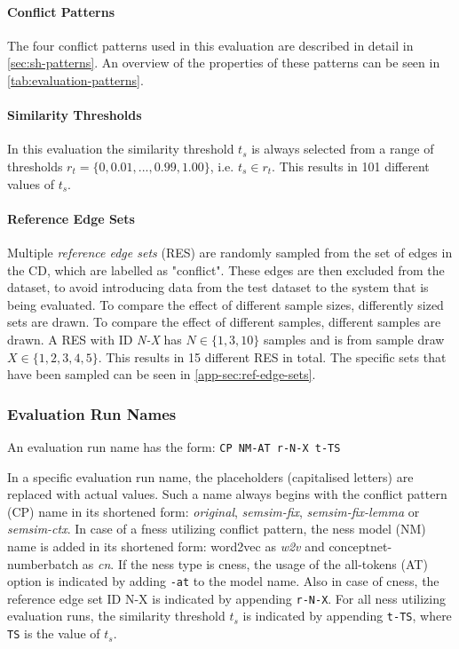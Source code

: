 \documentclass[11pt]{scrreprt}
\begin{document}
{\paragraph{Conflict Patterns}
The four conflict patterns used in this evaluation are described in detail in \cref{sec:sh-patterns}. An overview of the properties of these patterns can be seen in \cref{tab:evaluation-patterns}.


\paragraph{Similarity Thresholds}
In this evaluation the similarity threshold \(t_s\) is always selected from a range of thresholds \(r_t = \{0, 0.01, ...,  0.99, 1.00\}\), i.e. \(t_s \in r_t\). This results in 101 different values of \(t_s\).


\paragraph{Reference Edge Sets}
Multiple \textit{reference edge sets} (RES)  are randomly sampled from the set of edges in the CD, which are labelled as "conflict". These edges are then excluded from the dataset, to avoid introducing data from the test dataset to the system that is being evaluated. To compare the effect of different sample sizes, differently sized sets are drawn. To compare the effect of different samples, different samples are drawn. A RES with ID \textit{N-X} has \(N \in \{1, 3, 10\}\) samples and is from sample draw \(X \in \{1, 2, 3, 4, 5\}\). This results in 15 different RES in total. The specific sets that have been sampled can be seen in \cref{app-sec:ref-edge-sets}.


\subsubsection{Evaluation Run Names}
\label{sec:eval-run-names}
An evaluation run name has the form: \texttt{CP NM-AT r-N-X t-TS}

In a specific evaluation run name, the placeholders (capitalised letters) are replaced with actual values. Such a name always begins with the conflict pattern (CP) name in its shortened form: \textit{original}, \textit{semsim-fix}, \textit{semsim-fix-lemma} or \textit{semsim-ctx}. In case of a \gls{fness} utilizing conflict pattern, the \gls{ness} model (NM) name is added in its shortened form: word2vec as \textit{w2v} and conceptnet-numberbatch as \textit{cn}. If the \gls{ness} type is \gls{cness}, the usage of the all-tokens (AT) option is indicated by adding \texttt{-at} to the model name. Also in case of \gls{cness}, the reference edge set ID N-X is indicated by appending \texttt{r-N-X}. For all \gls{ness} utilizing evaluation runs, the similarity threshold \(t_s\) is indicated by appending \texttt{t-TS}, where \texttt{TS} is the value of \(t_s\).



}
\end{document}
